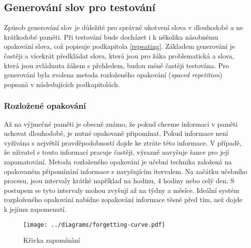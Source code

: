 \documentclass[a4paper,11pt,titlepage,fleqn]{article}
\begin{document}
    \subsection{Generování slov pro testování}
        Způsob generování slov je důležité pro správné ukotvení slova v dlouhodobé a ne krátkodobé paměti. Při testování bude docházet i k několika násobnému opakování slova, což popisuje podkapitola \ref{repeating}. Základem generování je častěji a vícekrát předkládat slova, která jsou pro žáka problematická a slova, která jsou zvládnuta žákem s přehledem, budou méně častěji testována. Pro generování byla zvolena metoda rozloženého opakování (\textit{spaced repetition}) popsaná v následujících podkapitolách.

        \subsubsection{Rozložené opakování} %
            Až na výjmečné paměti je obecně známo, že pokud chceme informaci v paměti uchovat dlouhodobě, je nutné opakovaně připomínat. Pokud informace není vyžívána s největší pravděpodobností dojde ke ztráte této informace. V případě, že uživatel s touto informací pracuje častěji, výrazně navyšuje šance pro její zapamatování. Metoda rozloženého opakování je učební technika založená na opakovaném připomínání informace s navyšujícím itervalem. Na začátku učebního procesu, jsou intervaly krátké například na hodinu, 4 hodiny nebo celý den. S postupem se tyto intervaly mohou zvyšují až na týdny a měsíce. Ideální systém rozploženého opakování nabídne zopakování informace těsně před tím, než dojde k jejímu zapomenutí.

        \begin{figure}[ht!]
            \centering
            \texttt{[image: ../diagrams/forgetting-curve.pdf]}
            \caption{Křivka zapomínání}
            \label{fig:forgetting-curve}
        \end{figure}


            
\end{document}
